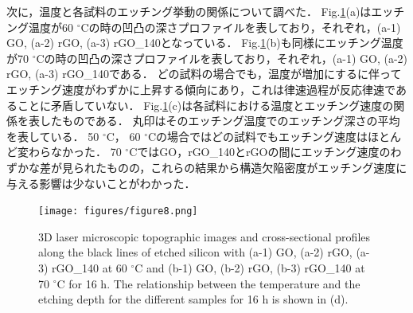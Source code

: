 \documentclass[platex,dvipdfmx]{jlreq}			%
\begin{document}
次に，温度と各試料のエッチング挙動の関係について調べた．
Fig.\ref{fig:Etching_temp}(a)はエッチング温度が60 ${}^\circ$Cの時の凹凸の深さプロファイルを表しており，それぞれ，(a-1) GO, (a-2) rGO, (a-3) rGO\_140となっている．
Fig.\ref{fig:Etching_temp}(b)も同様にエッチング温度が70 ${}^\circ$Cの時の凹凸の深さプロファイルを表しており，それぞれ，(a-1) GO, (a-2) rGO, (a-3) rGO\_140である．
どの試料の場合でも，温度が増加にするに伴ってエッチング速度がわずかに上昇する傾向にあり，これは律速過程が反応律速であることに矛盾していない．
Fig.\ref{fig:Etching_temp}(c)は各試料における温度とエッチング速度の関係を表したものである．
丸印はそのエッチング温度でのエッチング深さの平均を表している．
50 ${}^\circ$C， 60 ${}^\circ$Cの場合ではどの試料でもエッチング速度はほとんど変わらなかった．
70 ${}^\circ$CではGO，rGO\_140とrGOの間にエッチング速度のわずかな差が見られたものの，これらの結果から構造欠陥密度がエッチング速度に与える影響は少ないことがわかった．


\begin{figure}[H]
    \centering
    \texttt{[image: figures/figure8.png]}
    \caption{3D laser microscopic topographic images and cross-sectional profiles along the black lines of etched silicon with (a-1) GO, (a-2) rGO, (a-3) rGO\_140 at 60 ${}^\circ$C and (b-1) GO, (b-2) rGO, (b-3) rGO\_140 at 70 ${}^\circ$C for 16 h. The relationship between the temperature and the etching depth for the different samples for 16 h is shown in (d).}
    \label{fig:Etching_temp}
\end{figure}



\end{document}
